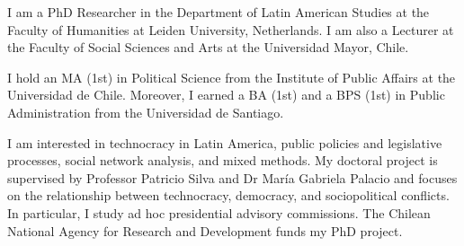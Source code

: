 




\par{I am a PhD Researcher in the Department of Latin American Studies at the Faculty of Humanities at Leiden University, Netherlands. I am also a Lecturer at the Faculty of Social Sciences and Arts at the Universidad Mayor, Chile.

I hold an MA (1st) in Political Science from the Institute of Public Affairs at the Universidad de Chile. Moreover, I earned a BA (1st) and a BPS (1st) in Public Administration from the Universidad de Santiago.

I am interested in technocracy in Latin America, public policies and legislative processes, social network analysis, and mixed methods. My doctoral project is supervised by Professor Patricio Silva and Dr María Gabriela Palacio and focuses on the relationship between technocracy, democracy, and sociopolitical conflicts. In particular, I study ad hoc presidential advisory commissions. The Chilean National Agency for Research and Development funds my PhD project.}\\